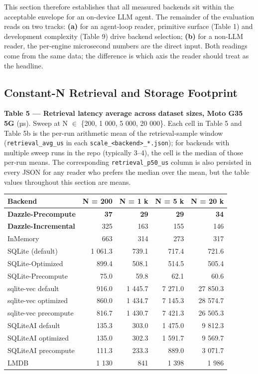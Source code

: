 This section therefore establishes that all measured backends sit within the
acceptable envelope for an on-device LLM agent. The remainder of the evaluation
reads on two tracks: \textbf{(a)} for an agent-loop reader, primitive surface
(Table 1) and development complexity (Table 9) drive backend selection;
\textbf{(b)} for a non-LLM reader, the per-engine microsecond numbers are the
direct input. Both readings come from the same data; the difference is which
axis the reader should treat as the headline.

\subsection{Constant-N Retrieval and Storage
Footprint}\label{constant-n-retrieval-and-storage-footprint}

\textbf{Table 5 --- Retrieval latency average across dataset sizes, Moto G35 5G}
(µs). Sweep at N \(\in\) \{200, 1 000, 5 000, 20 000\}. Each cell in Table 5 and
Table 5b is the per-run arithmetic mean of the retrieval-sample window
(\texttt{retrieval\_avg\_us} in each
\texttt{scale\_\textless{}backend\textgreater{}\_*.json}); for backends with
multiple sweep runs in the repo (typically 3--4), the cell is the median of
those per-run means. The corresponding \texttt{retrieval\_p50\_us} column is
also persisted in every JSON for any reader who prefers the median over the
mean, but the table values throughout this section are means.

{\def\LTcaptype{none} %
\begin{longtable}[]{@{}lrrrr@{}}
\toprule\noalign{}
Backend & N = 200 & N = 1 k & N = 5 k & N = 20 k \\
\midrule\noalign{}
\endhead
\bottomrule\noalign{}
\endlastfoot
\textbf{Dazzle-Precompute} & \textbf{37} & \textbf{29} & \textbf{29} &
\textbf{34} \\
\textbf{Dazzle-Incremental} & 325 & 163 & 155 & 146 \\
InMemory & 663 & 314 & 273 & 317 \\
SQLite (default) & 1 061.3 & 739.1 & 717.4 & 721.6 \\
SQLite-Optimized & 899.4 & 508.1 & 514.5 & 505.4 \\
SQLite-Precompute & 75.0 & 59.8 & 62.1 & 60.6 \\
sqlite-vec default & 916.0 & 1 445.7 & 7 271.0 & 27 850.3 \\
sqlite-vec optimized & 860.0 & 1 434.7 & 7 145.3 & 28 574.7 \\
sqlite-vec precompute & 816.7 & 1 430.7 & 7 421.3 & 26 505.3 \\
SQLiteAI default & 135.3 & 303.0 & 1 475.0 & 9 812.3 \\
SQLiteAI optimized & 135.0 & 302.3 & 1 591.7 & 9 569.7 \\
SQLiteAI precompute & 111.3 & 233.3 & 889.0 & 3 071.7 \\
LMDB & 1 130 & 841 & 1 398 & 1 986 \\
\end{longtable}
}


